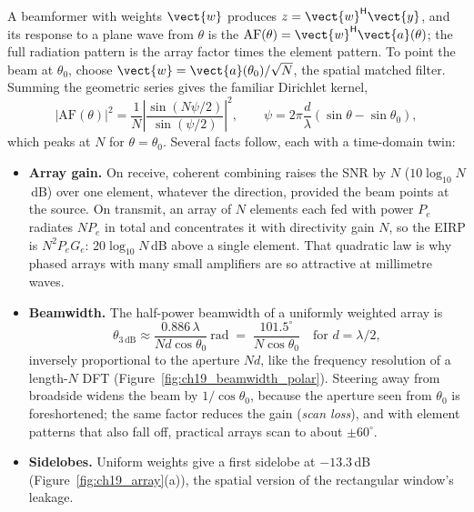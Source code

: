 A beamformer with weights $\vect{w}$ produces $z=\vect{w}^{\mathsf H}\vect{y}$, and its response to a
plane wave from $\theta$ is the  $\mathrm{AF}(\theta)=\vect{w}^{\mathsf H}\vect{a}(\theta)$;
the full radiation pattern is the array factor times the element pattern. To point the beam at
$\theta_0$, choose $\vect{w}=\vect{a}(\theta_0)/\sqrt{N}$, the spatial matched filter. Summing the
geometric series gives the familiar Dirichlet kernel,
\begin{equation}
|\mathrm{AF}(\theta)|^2=\frac{1}{N}\left|\frac{\sin(N\psi/2)}{\sin(\psi/2)}\right|^2,
\qquad\psi=2\pi\frac{d}{\lambda}(\sin\theta-\sin\theta_0),
\label{eq:ch19:af}
\end{equation}
which peaks at $N$ for $\theta=\theta_0$. Several facts follow, each with a time-domain twin:
\begin{itemize}
\item \textbf{Array gain.} On receive, coherent combining raises the SNR by $N$
($10\log_{10}N$\,dB) over one element, whatever the direction, provided the beam points at the
source. On transmit, an array of $N$ elements each fed with power $P_e$ radiates $NP_e$ in total
and concentrates it with directivity gain $N$, so the EIRP is $N^2P_eG_e$: $20\log_{10}N$\,dB above
a single element. That quadratic law is why phased arrays with many small amplifiers are so
attractive at millimetre waves.
\item \textbf{Beamwidth.} The half-power beamwidth of a uniformly weighted array is
\begin{equation}
\theta_{3\,\text{dB}}\approx\frac{0.886\,\lambda}{Nd\cos\theta_0}\ \text{rad}
\;=\;\frac{101.5^\circ}{N\cos\theta_0}\quad\text{for }d=\lambda/2,
\label{eq:ch19:hpbw}
\end{equation}
inversely proportional to the aperture $Nd$, like the frequency resolution of a length-$N$ DFT
(Figure~\ref{fig:ch19_beamwidth_polar}). Steering away from broadside widens the beam by
$1/\cos\theta_0$, because the aperture seen from $\theta_0$ is foreshortened; the same factor
reduces the gain (\emph{scan loss}), and with element patterns that also fall off, practical arrays
scan to about $\pm60^\circ$.
\item \textbf{Sidelobes.} Uniform weights give a first sidelobe at $-13.3$\,dB
(Figure~\ref{fig:ch19_array}(a)), the spatial version of the rectangular window's leakage.
\end{itemize}


